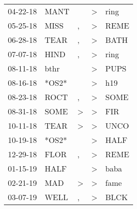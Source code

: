\begin{supertabular}{p{0.07\textwidth}p{0.06\textwidth}p{0.02\textwidth}p{0.02\textwidth}p{0.06\textwidth}}
          04-22-18\textsuperscript{} &           MANT\textsuperscript{} &                  &     \textgreater &           ring\textsuperscript{} \\
          05-25-18\textsuperscript{} &           MISS\textsuperscript{} &                , &     \textgreater &           REME\textsuperscript{} \\
          06-28-18\textsuperscript{} &           TEAR\textsuperscript{} &                , &     \textgreater &           BATH\textsuperscript{} \\
          07-07-18\textsuperscript{} &           HIND\textsuperscript{} &                , &     \textgreater &           ring\textsuperscript{} \\
          08-11-18\textsuperscript{} &           bthr\textsuperscript{} &                  &     \textgreater &           PUPS\textsuperscript{} \\
          08-16-18\textsuperscript{} &                            *OS2* &                  &     \textgreater &            h19\textsuperscript{} \\
          08-23-18\textsuperscript{} &           ROCT\textsuperscript{} &                , &     \textgreater &           SOME\textsuperscript{} \\
          08-31-18\textsuperscript{} &           SOME\textsuperscript{} &     \textgreater &     \textgreater &            FIR\textsuperscript{} \\
          10-11-18\textsuperscript{} &           TEAR\textsuperscript{} &     \textgreater &     \textgreater &           UNCO\textsuperscript{} \\
          10-19-18\textsuperscript{} &                            *OS2* &                  &     \textgreater &           HALF\textsuperscript{} \\
          12-29-18\textsuperscript{} &           FLOR\textsuperscript{} &                , &     \textgreater &           REME\textsuperscript{} \\
          01-15-19\textsuperscript{} &           HALF\textsuperscript{} &                  &     \textgreater &           baba\textsuperscript{} \\
          02-21-19\textsuperscript{} &            MAD\textsuperscript{} &     \textgreater &     \textgreater &           fame\textsuperscript{} \\
          03-07-19\textsuperscript{} &           WELL\textsuperscript{} &                , &     \textgreater &           BLCK\textsuperscript{} \\

\end{supertabular}
